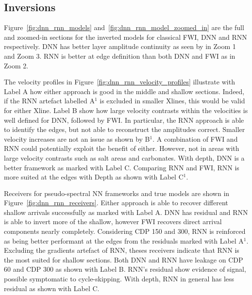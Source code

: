 {%

\subsection{Inversions}
Figure~\ref{fig:dnn_rnn_models} and~\ref{fig:dnn_rnn_model_zoomed_in} are the full and zoomed-in sections for the inverted models for classical FWI, DNN and RNN respectively. DNN has better layer amplitude continuity as seen by in Zoom 1 and Zoom 3. RNN is better at edge definition than both DNN and FWI as in Zoom 2. 

The velocity profiles in Figure~\ref{fig:dnn_rnn_velocity_profiles} illustrate with Label A how either approach is good in the middle and shallow sections. Indeed, if the RNN artefact labelled A$^{1}$ is excluded in smaller Xlines, this would be valid for either Xline. Label B show how large velocity contrasts within the velocities is well defined for DNN, followed by FWI. In particular, the RNN approach is able to identify the edges, but not able to reconstruct the amplitudes correct. Smaller velocity increases are not an issue as shown by B$^{1}$. A combination of FWI and RNN could potentially exploit the benefit of either. However, not in areas with large velocity contrasts such as salt areas and carbonates. With depth, DNN is a better framework as marked with Label C. Comparing RNN and FWI, RNN is more suited at the edges with Depth as shown with Label C$^{1}$. 

Receivers for pseudo-spectral NN frameworks and true models are shown in Figure~\ref{fig:dnn_rnn_receivers}. Either approach is able to recover different shallow arrivals successfully as marked with Label A. DNN has residual and RNN is able to invert more of the shallow, however FWI recovers direct arrival components nearly completely. Considering CDP 150 and 300, RNN is reinforced as being better performant at the edges from the residuals marked with Label A$^1$. Excluding the gradients artefact of RNN, theses receivers indicate that RNN is the most suited for shallow sections. Both DNN and RNN have leakage on CDP 60 and CDP 300 as shown with Label B. RNN's residual show evidence of signal, possible symptomatic to cycle-skipping. With depth, RNN in general has less residual as shown with Label C.

}
